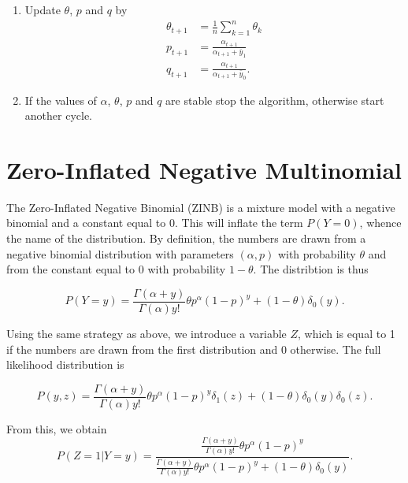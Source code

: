 \documentclass[12pt]{article}
\begin{document}
\begin{appendices}
\begin{enumerate}
      \item Update $\theta$, $p$ and $q$ by
        \begin{align*}
        \theta_{t+1} &= \frac{1}{n}\sum_{k=1}^n\theta_k \\
        p_{t+1} &= \frac{\alpha_{t+1}} {\alpha_{t+1}+\bar{y}_1} \\
        q_{t+1} &= \frac{\alpha_{t+1}} {\alpha_{t+1}+\bar{y}_0}.
        \end{align*}

      \item If the values of $\alpha$, $\theta$, $p$ and $q$ are
      stable stop the algorithm, otherwise start another cycle.
    \end{enumerate}

    \section{Zero-Inflated Negative Multinomial}

    The Zero-Inflated Negative Binomial (ZINB) is a mixture model
    with a negative binomial and a constant equal to 0. This will
    inflate the term $P(Y=0)$, whence the name of the distribution.
    By definition, the numbers are drawn from a negative binomial
    distribution with parameters $(\alpha, p)$ with probability
    $\theta$ and from the constant equal to 0 with probability
    $1-\theta$. The distribtion is thus

    \begin{equation*}
    P(Y = y) = \frac{\Gamma(\alpha+y)}{\Gamma(\alpha)y!}
    \theta p^{\alpha}(1-p)^y + (1-\theta)\delta_0(y).
    \end{equation*}

    Using the same strategy as above, we introduce a variable $Z$,
    which is equal to 1 if the numbers are drawn from the first
    distribution and 0 otherwise. The full likelihood distribution
    is

    \begin{equation*}
    P(y,z) = \frac{\Gamma(\alpha+y)}{\Gamma(\alpha)y!}
    \theta p^{\alpha}(1-p)^y\delta_1(z) +
    (1-\theta)\delta_0(y)\delta_0(z).
    \end{equation*}

    From this, we obtain
    \begin{equation*}
    P(Z=1|Y=y) =\frac{\frac{\Gamma(\alpha+y)}{\Gamma(\alpha)y!}
    \theta p^{\alpha}(1-p)^y}{
    \frac{\Gamma(\alpha+y)}{\Gamma(\alpha)y!}
    \theta p^{\alpha}(1-p)^y + (1-\theta)\delta_0(y)}.
    \end{equation*}


\end{appendices}
\end{document}

